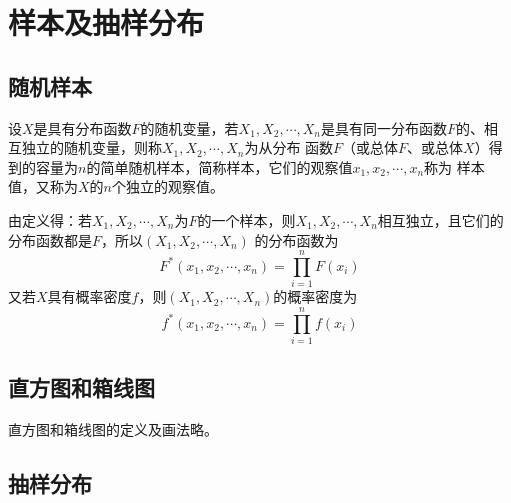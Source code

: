\section{样本及抽样分布}
\subsection{随机样本}

\begin{definition}
    设$X$是具有分布函数$F$的随机变量，若$X_1,X_2,\cdots,X_n$是具有同一分布函数$F$的、相互独立的随机变量，则称$X_1,X_2,\cdots,X_n$为从分布
    函数$F$（或总体$F$、或总体$X$）得到的{\heiti 容量为$n$的简单随机样本}，简称{\heiti 样本}，它们的观察值$x_1,x_2,\cdots,x_n$称为
    {\heiti 样本值}，又称为$X$的$n$个{\heiti 独立的观察值}。

    由定义得：若$X_1,X_2,\cdots,X_n$为$F$的一个样本，则$X_1,X_2,\cdots,X_n$相互独立，且它们的分布函数都是$F$，所以$(X_1,X_2,\cdots,X_n)$
    的分布函数为
    $$F^\ast(x_1,x_2,\cdots,x_n)=\prod _{i=1}^n F(x_i)$$
    又若$X$具有概率密度$f$，则$(X_1,X_2,\cdots,X_n)$的概率密度为
    $$f^\ast(x_1,x_2,\cdots,x_n)=\prod _{i=1}^n f(x_i)$$
\end{definition}

\subsection{直方图和箱线图}
直方图和箱线图的定义及画法略。

\subsection{抽样分布}

